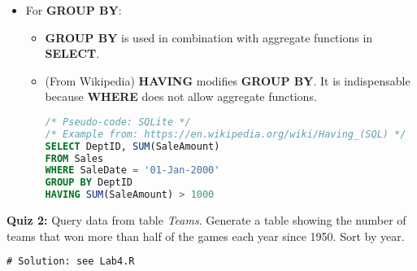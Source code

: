 \documentclass[12pt]{article}
\begin{document}
\begin{itemize}
\begin{itemize}[label=*]
\begin{lstlisting}[style=displaycode, language=SQL]
\end{lstlisting}
	\end{itemize}
{\bf Quiz 1:} Extract data from table \emph{Master}. Generate a table with all variables in Master for players born in 1980s and sort by their names.
\begin{lstlisting}[style=displaycode, language=SQL]
# Solution: see Lab4.R
\end{lstlisting}
	\item For {\bf GROUP BY}:
	\begin{itemize}[label=*]
		\item {\bf GROUP BY} is used in combination with aggregate functions in {\bf SELECT}.
		\item (From Wikipedia) {\bf HAVING} modifies {\bf GROUP BY}. It is indispensable because {\bf WHERE} does not allow aggregate functions.
\begin{lstlisting}[style=displaycode, language=SQL]
/* Pseudo-code: SQLite */
/* Example from: https://en.wikipedia.org/wiki/Having_(SQL) */
SELECT DeptID, SUM(SaleAmount)
FROM Sales
WHERE SaleDate = '01-Jan-2000'
GROUP BY DeptID
HAVING SUM(SaleAmount) > 1000
\end{lstlisting}
	\end{itemize}
\end{itemize}

{\bf Quiz 2:} Query data from table \emph{Teams}. Generate a table showing the number of teams that won more than half of the games each year since 1950. Sort by year.

\begin{lstlisting}[style=displaycode, language=SQL]
# Solution: see Lab4.R
\end{lstlisting}
\end{document}
